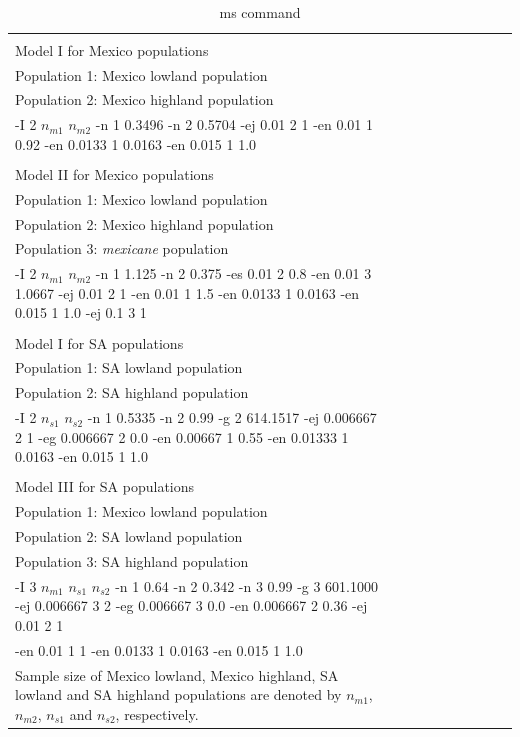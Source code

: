 \documentclass[onecolumn,oneside,letterpaper]{article}
\begin{document}
\renewcommand{\arraystretch}{1.1}
\begin{table}[tb]

\begin{center}
 \caption[]{ms command\hspace*{11.3cm}}
  \textbf{}\\[-2mm]
{\fontsize{7}{11}\sf
    \begin{tabular}{llcccccccl} \hline
       & & \\[-3mm]
     Model I for Mexico  populations   \\
     Population 1: Mexico lowland population   \\
     Population 2: Mexico highland population   \\
  -I 2 $n_{m1}$ $n_{m2}$ -n 1 0.3496 -n 2 0.5704 -ej 0.01 2 1 -en 0.01 1 0.92 -en 0.0133 1 0.0163 -en 0.015 1 1.0 \\ 
      \hline
    & & \\[-3mm]
     Model II for Mexico  populations   \\
     Population 1: Mexico lowland population   \\
     Population 2: Mexico highland population   \\
     Population 3: \emph{mexicane} population   \\
-I 2 $n_{m1}$ $n_{m2}$ -n 1 1.125 -n 2 0.375 -es 0.01 2 0.8 -en 0.01 3 1.0667 -ej 0.01 2 1 -en 0.01 1 1.5 -en 0.0133 1 0.0163 -en 0.015 1 1.0 -ej 0.1 3 1 \\ 
      \hline
    & & \\[-3mm]
    Model I for SA  populations   \\
     Population 1: SA lowland population   \\
     Population 2: SA highland population   \\
  -I 2 $n_{s1}$ $n_{s2}$ -n 1 0.5335 -n 2 0.99 -g 2 614.1517 -ej 0.006667 2 1 -eg 0.006667 2 0.0 -en 0.00667 1 0.55 -en 0.01333 1 0.0163 -en 0.015 1 1.0 \\ 
      \hline
    & & \\[-3mm]
    Model III for SA  populations   \\
    Population 1: Mexico lowland population   \\
     Population 2: SA lowland population   \\
     Population 3: SA highland population   \\
  -I 3 $n_{m1}$ $n_{s1}$ $n_{s2}$ -n 1 0.64 -n 2 0.342 -n 3 0.99 -g 3 601.1000 -ej 0.006667 3 2 -eg 0.006667 3 0.0 -en 0.006667 2 0.36 -ej 0.01 2 1\\
   -en 0.01 1 1 -en 0.0133 1 0.0163 -en 0.015 1 1.0 \\  [1mm]
    \hline
\multicolumn{1}{l}{Sample size of Mexico lowland, Mexico highland, SA lowland and SA highland populations are denoted by $n_{m1}$, $n_{m2}$, $n_{s1}$ and $n_{s2}$, respectively.}\\
    \end{tabular}
    \label{param}  %
}
\end{center}
\end{table}
\end{document}
